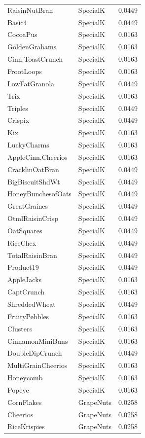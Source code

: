 \begin{table}[!htbp]
\begin{tabular}{lll}
RaisinNutBran & SpecialK & 0.0449
\\
Basic4 & SpecialK & 0.0449
\\
CocoaPus & SpecialK & 0.0163
\\
GoldenGrahams & SpecialK & 0.0163
\\
Cinn.ToastCrunch & SpecialK & 0.0163
\\
FrootLoops & SpecialK & 0.0163
\\
LowFatGranola & SpecialK & 0.0449
\\
Trix & SpecialK & 0.0163
\\
Triples & SpecialK & 0.0449
\\
Crispix & SpecialK & 0.0449
\\
Kix & SpecialK & 0.0163
\\
LuckyCharms & SpecialK & 0.0163
\\
AppleCinn.Cheerios & SpecialK & 0.0163
\\
CracklinOatBran & SpecialK & 0.0449
\\
BigBiscuitShdWt & SpecialK & 0.0449
\\
HoneyBunchesofOats & SpecialK & 0.0449
\\
GreatGraines & SpecialK & 0.0449
\\
OtmlRaisinCrisp & SpecialK & 0.0449
\\
OatSquares & SpecialK & 0.0449
\\
RiceChex & SpecialK & 0.0449
\\
TotalRaisinBran & SpecialK & 0.0449
\\
Product19 & SpecialK & 0.0449
\\
AppleJacks & SpecialK & 0.0163
\\
CaptCrunch & SpecialK & 0.0163
\\
ShreddedWheat & SpecialK & 0.0449
\\
FruityPebbles & SpecialK & 0.0163
\\
Clusters & SpecialK & 0.0163
\\
CinnamonMiniBuns & SpecialK & 0.0163
\\
DoubleDipCrunch & SpecialK & 0.0449
\\
MultiGrainCheerios & SpecialK & 0.0163
\\
Honeycomb & SpecialK & 0.0163
\\
Popeye & SpecialK & 0.0163
\\
CornFlakes & GrapeNuts & 0.0258
\\
Cheerios & GrapeNuts & 0.0258
\\
RiceKrispies & GrapeNuts & 0.0258
\\

\end{tabular}
\end{table}
